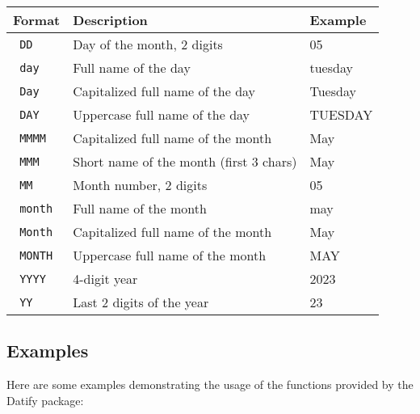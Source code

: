 \begin{longtable}[]{@{}lll@{}}
\toprule\noalign{}
Format & Description & Example \\
\midrule\noalign{}
\endhead
\bottomrule\noalign{}
\endlastfoot
\texttt{\ DD\ } & Day of the month, 2 digits & 05 \\
\texttt{\ day\ } & Full name of the day & tuesday \\
\texttt{\ Day\ } & Capitalized full name of the day & Tuesday \\
\texttt{\ DAY\ } & Uppercase full name of the day & TUESDAY \\
\texttt{\ MMMM\ } & Capitalized full name of the month & May \\
\texttt{\ MMM\ } & Short name of the month (first 3 chars) & May \\
\texttt{\ MM\ } & Month number, 2 digits & 05 \\
\texttt{\ month\ } & Full name of the month & may \\
\texttt{\ Month\ } & Capitalized full name of the month & May \\
\texttt{\ MONTH\ } & Uppercase full name of the month & MAY \\
\texttt{\ YYYY\ } & 4-digit year & 2023 \\
\texttt{\ YY\ } & Last 2 digits of the year & 23 \\
\end{longtable}

\subsection{Examples}\label{examples}

Here are some examples demonstrating the usage of the functions provided
by the Datify package:

\begin{Shaded}
\begin{Highlighting}[]



\end{Highlighting}
\end{Shaded}

